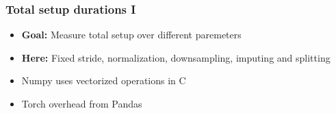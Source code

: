 \documentclass[t,english]{beamer}
\begin{document}
\begin{frame}
    \frametitle{Total setup durations I}
        \begin{itemize}
        \item<1-> \textbf{Goal:} Measure total setup over different paremeters
        \item<2-> \textbf{Here:} Fixed stride, normalization, downsampling, imputing and splitting
        \end{itemize}
    \begin{itemize}
        \item<4->  Numpy uses vectorized operations in C 
        \item<5->Torch overhead from Pandas
    \end{itemize}
\end{frame}
\end{document}
